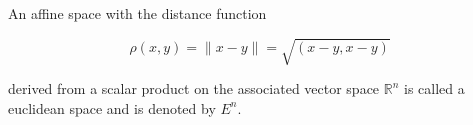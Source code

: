 An affine space with the distance function

$$\rho(x, y) = \|x - y\| = \sqrt{(x - y, x - y)}$$

derived from a scalar product on the associated vector space $\mathbb{R}^n$ is called a euclidean space and is denoted by $E^n$.
